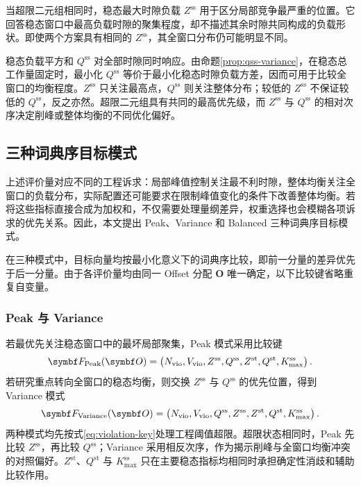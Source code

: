 \documentclass[UTF8,a4paper,twoside,zihao=-4]{ctexart}
\numberwithin{equation}{section}
\numberwithin{figure}{section}
\numberwithin{table}{section}
\theoremstyle{definition}
\numberwithin{algocf}{section}
\begin{document}
当超限二元组相同时，稳态最大时隙负载 $Z^{\mathrm{ss}}$ 用于区分局部竞争最严重的位置。它回答稳态窗口中最高负载时隙的聚集程度，却不描述其余时隙共同构成的负载形状。即使两个方案具有相同的 $Z^{\mathrm{ss}}$，其全窗口分布仍可能明显不同。

稳态负载平方和 $Q^{\mathrm{ss}}$ 对全部时隙同时响应。由命题\ref{prop:qss-variance}，在稳态总工作量固定时，最小化 $Q^{\mathrm{ss}}$ 等价于最小化稳态时隙负载方差，因而可用于比较全窗口的均衡程度。$Z^{\mathrm{ss}}$ 只关注最高点，$Q^{\mathrm{ss}}$ 则关注整体分布；较低的 $Z^{\mathrm{ss}}$ 不保证较低的 $Q^{\mathrm{ss}}$，反之亦然。超限二元组具有共同的最高优先级，而 $Z^{\mathrm{ss}}$ 与 $Q^{\mathrm{ss}}$ 的相对次序决定削峰或整体均衡的不同优化偏好。

\subsection{三种词典序目标模式}

上述评价量对应不同的工程诉求：局部峰值控制关注最不利时隙，整体均衡关注全窗口的负载分布，实际配置还可能要求在限制峰值变化的条件下改善整体均衡。若将这些指标直接合成为加权和，不仅需要处理量纲差异，权重选择也会模糊各项诉求的优先关系。因此，本文提出 Peak、Variance 和 Balanced 三种词典序目标模式。

在三种模式中，目标向量均按最小化意义下的词典序比较，即前一分量的差异优先于后一分量。由于各评价量均由同一 Offset 分配 $\symbf O$ 唯一确定，以下比较键省略重复自变量。

\subsubsection{Peak 与 Variance}

若最优先关注稳态窗口中的最坏局部聚集，Peak 模式采用比较键
\begin{equation}
 \symbf F_{\rm Peak}(\symbf O)=
 \left(
  N_{\rm vio},
  V_{\rm vio},
  Z^{\mathrm{ss}},
  Q^{\mathrm{ss}},
  Z^{\mathrm{st}},
  Q^{\mathrm{st}},
  K_{\max}^{\mathrm{ss}}
 \right).
\label{eq:peak-objective-key}
\end{equation}
若研究重点转向全窗口的稳态均衡，则交换 $Z^{\mathrm{ss}}$ 与 $Q^{\mathrm{ss}}$ 的优先位置，得到 Variance 模式
\begin{equation}
 \symbf F_{\rm Variance}(\symbf O)=
 \left(
  N_{\rm vio},
  V_{\rm vio},
  Q^{\mathrm{ss}},
  Z^{\mathrm{ss}},
  Z^{\mathrm{st}},
  Q^{\mathrm{st}},
  K_{\max}^{\mathrm{ss}}
 \right).
\label{eq:variance-objective-key}
\end{equation}
两种模式均先按式\eqref{eq:violation-key}处理工程阈值超限。超限状态相同时，Peak 先比较 $Z^{\mathrm{ss}}$，再比较 $Q^{\mathrm{ss}}$；Variance 采用相反次序，作为揭示削峰与全窗口均衡冲突的对照偏好。$Z^{\mathrm{st}}$、$Q^{\mathrm{st}}$ 与 $K_{\max}^{\mathrm{ss}}$ 只在主要稳态指标均相同时承担确定性消歧和辅助比较作用。
\end{document}
